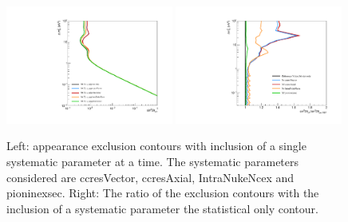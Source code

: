 \begin{figure}[h!]
    \centering
    \includegraphics[width = 0.49\textwidth]{figures-chap6/exclusion_contours/single_param/nue_app_single_param.pdf}
    \includegraphics[width =0.49\textwidth]{figures-chap6/exclusion_contours/single_param/nue_app_single_param_ratio.pdf}
    \caption[\nue appearance exclusion contours with inclusion of a single systematic parameter at a time.]{Left: \nue appearance exclusion contours with inclusion of a single systematic parameter at a time. The systematic parameters considered are ccresVector, ccresAxial, IntraNukeNcex and pioninexsec. Right: The ratio of the exclusion contours with the inclusion of a systematic parameter the statistical only contour.}
    \label{fig:nue_app_single_param}
\end{figure}

